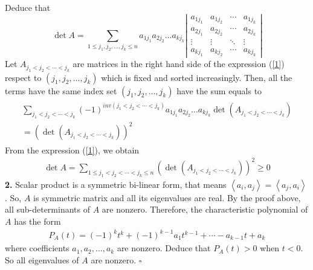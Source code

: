 \documentclass{article}
\numberwithin{equation}{section}
\begin{document}
Deduce that 
\begin{equation}
\label{1}
\det A = \sum\limits_{1 \le {j_1},{j_2}, \ldots ,{j_k} \le n} {{a_{1{j_1}}}{a_{2{j_2}}} \ldots {a_{k{j_k}}}} \left| {\begin{array}{*{20}{c}}
{{a_{1{j_1}}}}&{{a_{1{j_2}}}}& \cdots &{{a_{1{j_k}}}}\\
{{a_{2{j_1}}}}&{{a_{2{j_2}}}}& \cdots &{{a_{2{j_k}}}}\\
 \vdots & \vdots & \ddots & \vdots \\
{{a_{k{j_1}}}}&{{a_{k{j_2}}}}& \cdots &{{a_{k{j_k}}}}
\end{array}} \right|
\end{equation}
Let ${A_{{j_1} < {j_2} <  \cdots  < {j_k}}}$ are matrices in the right hand side of the expression (\ref{1}) respect to $\left( {{j_1},{j_2}, \ldots ,{j_k}} \right)$ which is fixed and sorted increasingly. Then, all the terms have the same index set $\left( {{j_1},{j_2}, \ldots ,{j_k}} \right)$ have the sum equals to
\begin{align}
\begin{array}{l}
\sum\limits_{{j_1} < {j_2} <  \cdots  < {j_k}} {{{\left( { - 1} \right)}^{inv\left( {{j_1} < {j_2} <  \cdots  < {j_k}} \right)}}{a_{1{j_1}}}{a_{2{j_2}}} \ldots {a_{k{j_k}}}\det \left( {{A_{{j_1} < {j_2} <  \cdots  < {j_k}}}} \right)} \\
 = {\left( {\det \left( {{A_{{j_1} < {j_2} <  \cdots  < {j_k}}}} \right)} \right)^2}
\end{array}
\end{align}
From the expression (\ref{1}), we obtain 
\begin{align}
\det A = \sum\limits_{1 \le {j_1} < {j_2} <  \cdots  < {j_k} \le n} {{{\left( {\det \left( {{A_{{j_1} < {j_2} <  \cdots  < {j_k}}}} \right)} \right)}^2}}  \ge 0
\end{align}
\textbf{2.} Scalar product is a symmetric bi-linear form, that means $\left\langle {{a_i},{a_j}} \right\rangle  = \left\langle {{a_j},{a_i}} \right\rangle $. So, $A$ is symmetric matrix and all its eigenvalues are real. By the proof above, all sub-determinants of $A$ are nonzero. Therefore, the characteristic polynomial of $A$ has the form
\begin{align}
{P_A}\left( t \right) = {\left( { - 1} \right)^k}{t^k} + {\left( { - 1} \right)^{k - 1}}{a_1}{t^{k - 1}} +  \cdots  - {a_{k - 1}}t + {a_k}
\end{align}
where coefficients ${a_1},{a_2}, \ldots ,{a_k}$ are nonzero. Deduce that ${P_A}\left( t \right) > 0$ when $t<0$. So all eigenvalues of $A$ are nonzero. \hfill $\square$\\
\end{document}
